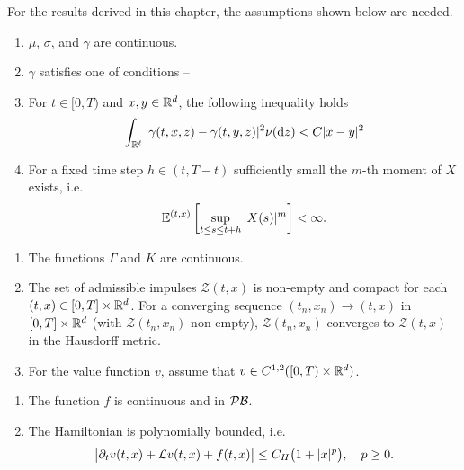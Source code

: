 For the results derived in this chapter, the assumptions shown below are needed. 
\begin{assumption}
    \label{C: Assumption S}
    \begin{enumerate}[label=(\textup{S}\arabic*), ref=(\textup{S}\arabic*)]
        \item \label{C: S1} $\mu$, $\sigma$, and $\gamma$ are continuous.
        \item \label{C: S2} $\gamma$ satisfies one of conditions -- 
        \item \label{C: S3} For $t \in [0,T)$ and $x,y \in \mathbb{R}^d$, the following inequality holds 
            \begin{align*}
                \int_{\mathbb R^\ell} |\gamma (t,x,z) - \gamma (t,y,z)|^2 \nu(\mathrm{d} z) < C|x-y|^2
            \end{align*}
        \item \label{C: S4} For a fixed time step $h \in (t,T-t)$ sufficiently small the $m$-th moment of $X$ exists, i.e.
        \begin{equation*}
            \mathbb{E}^{(t,x)} \left[\sup_{t \leq s \leq t+h} |X(s)|^m \right] < \infty.
        \end{equation*}
    \end{enumerate}
\end{assumption}
\begin{assumption}
    \label{C: Assumption I}
    \begin{enumerate}[label=(\textup{I}\arabic*), ref=(\textup{I}\arabic*)]
        \item \label{C: I1} The functions $\Gamma$ and $K$ are continuous.
        \item \label{C: I2} The set of admissible impulses $\mathcal{Z}(t,x)$ is non-empty and compact for each $(t,x) \in [0,T] \times \mathbb{R}^d$. For a converging sequence $(t_n,x_n) \rightarrow (t,x)$ in $[0,T] \times \mathbb{R}^d$ (with $\mathcal{Z}(t_n,x_n)$ non-empty), $\mathcal{Z}(t_n,x_n)$ converges to $\mathcal{Z}(t,x)$ in the Hausdorff metric.
        \item \label{C: I3} For the value function $v$, assume that $v \in C^{1,2}([0,T)\times \mathbb{R}^d)$. 
    \end{enumerate}
\end{assumption}
\begin{assumption}
    \label{C: Assumption H}
    \begin{enumerate}[label=(\textup{H}\arabic*), ref=(\textup{H}\arabic*)]
        \item \label{C: H1} The function $f$ is continuous and in $\mathcal{PB}$.
        \item \label{C: H2} The Hamiltonian is polynomially bounded, i.e.
        \begin{equation*}
            \big|\partial_t v(t,x) + \mathcal{L} v(t,x) + f(t,x) \big| \leq C_H\big(1+|x|^p\big), \quad p\geq 0.
        \end{equation*}
    \end{enumerate}
\end{assumption}
